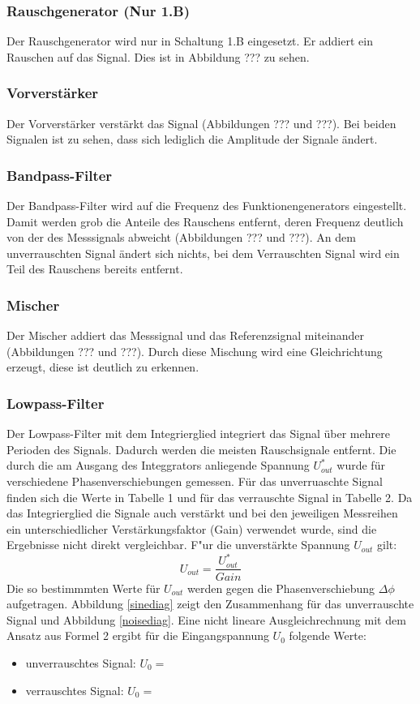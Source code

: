 \documentclass[11pt]{article}
\begin{document}
\subsubsection{Rauschgenerator (Nur 1.B)}
Der Rauschgenerator wird nur in Schaltung 1.B eingesetzt. Er addiert ein Rauschen auf das Signal. Dies ist in Abbildung ??? zu sehen. 
\subsubsection{Vorverstärker}
Der Vorverstärker verstärkt das Signal (Abbildungen ??? und ???). Bei beiden Signalen ist zu sehen, dass sich lediglich die Amplitude der Signale ändert.
\subsubsection{Bandpass-Filter}
Der Bandpass-Filter wird auf die Frequenz des Funktionengenerators eingestellt. Damit werden grob die Anteile des Rauschens entfernt, deren Frequenz deutlich von der des Messsignals abweicht (Abbildungen ??? und ???). An dem unverrauschten Signal ändert sich nichts, bei dem Verrauschten Signal wird ein Teil des Rauschens bereits entfernt.
\subsubsection{Mischer}
Der Mischer addiert das Messsignal und das Referenzsignal miteinander (Abbildungen ??? und ???). Durch diese Mischung wird eine Gleichrichtung erzeugt, diese ist deutlich zu erkennen.
\subsubsection{Lowpass-Filter}
Der Lowpass-Filter mit dem Integrierglied integriert das Signal über mehrere Perioden des Signals. Dadurch werden die meisten Rauschsignale entfernt. Die durch die am Ausgang des Integgrators anliegende Spannung $U_{out}^*$ wurde f\"ur verschiedene Phasenverschiebungen gemessen. F\"ur das unverruaschte Signal finden sich die Werte in Tabelle 1 und f\"ur das verrauschte Signal in Tabelle 2. Da das Integrierglied die Signale auch verst\"arkt und bei den jeweiligen Messreihen ein unterschiedlicher Verst\"arkungsfaktor (Gain) verwendet wurde, sind die Ergebnisse nicht direkt vergleichbar. F"ur die unverst\"arkte Spannung $U_{out}$ gilt:
\begin{equation}
U_{out} = \frac{U_{out}^*}{Gain}
\end{equation}
Die so bestimmmten Werte f\"ur $U_{out}$ werden gegen die Phasenverschiebung $\Delta \phi$ aufgetragen. Abbildung \ref{sinediag} zeigt den Zusammenhang f\"ur das unverrauschte Signal und Abbildung \ref{noisediag}. Eine nicht lineare Ausgleichrechnung mit dem Ansatz aus Formel 2 ergibt f\"ur die Eingangspannung $U_0$ folgende Werte:
\begin{itemize}
\item unverrauschtes Signal: $U_0=$
\item verrauschtes Signal: $U_0=$
\end{itemize} 
\end{document}
